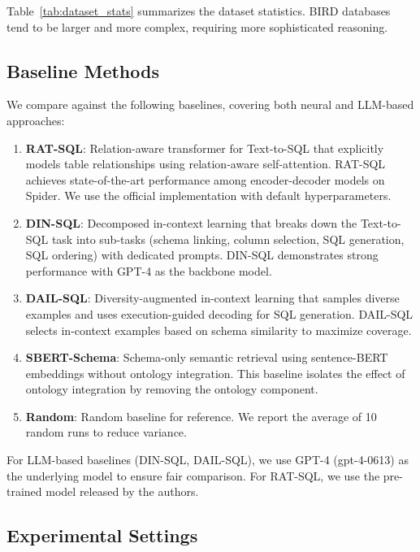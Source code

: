 \documentclass[sigconf, nonatbib]{acmart}
\begin{document}
Table~\ref{tab:dataset_stats} summarizes the dataset statistics. BIRD databases tend to be larger and more complex, requiring more sophisticated reasoning.

\subsection{Baseline Methods}

We compare against the following baselines, covering both neural and LLM-based approaches:

\begin{enumerate}
    \item \textbf{RAT-SQL}: Relation-aware transformer for Text-to-SQL that explicitly models table relationships using relation-aware self-attention. RAT-SQL achieves state-of-the-art performance among encoder-decoder models on Spider. We use the official implementation with default hyperparameters.
    
    \item \textbf{DIN-SQL}: Decomposed in-context learning that breaks down the Text-to-SQL task into sub-tasks (schema linking, column selection, SQL generation, SQL ordering) with dedicated prompts. DIN-SQL demonstrates strong performance with GPT-4 as the backbone model.
    
    \item \textbf{DAIL-SQL}: Diversity-augmented in-context learning that samples diverse examples and uses execution-guided decoding for SQL generation. DAIL-SQL selects in-context examples based on schema similarity to maximize coverage.
    
    \item \textbf{SBERT-Schema}: Schema-only semantic retrieval using sentence-BERT embeddings without ontology integration. This baseline isolates the effect of ontology integration by removing the ontology component.
    
    \item \textbf{Random}: Random baseline for reference. We report the average of 10 random runs to reduce variance.
\end{enumerate}

For LLM-based baselines (DIN-SQL, DAIL-SQL), we use GPT-4 (gpt-4-0613) as the underlying model to ensure fair comparison. For RAT-SQL, we use the pre-trained model released by the authors.

\subsection{Experimental Settings}
\end{document}
